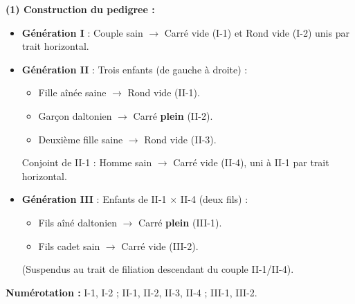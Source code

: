 \documentclass[11pt]{article}
\begin{document}
\begin{corrige}[Exercice 1]
\textbf{(1) Construction du pedigree :}
\begin{itemize}
\item \textbf{Génération I} : Couple sain $\rightarrow$ Carré vide (I-1) et Rond vide (I-2) unis par trait horizontal.
\item \textbf{Génération II} : Trois enfants (de gauche à droite) :
      \begin{itemize}
      \item Fille aînée saine $\rightarrow$ Rond vide (II-1).
      \item Garçon daltonien $\rightarrow$ Carré \textbf{plein} (II-2).
      \item Deuxième fille saine $\rightarrow$ Rond vide (II-3).
      \end{itemize}
      Conjoint de II-1 : Homme sain $\rightarrow$ Carré vide (II-4), uni à II-1 par trait horizontal.
\item \textbf{Génération III} : Enfants de II-1 $\times$ II-4 (deux fils) :
      \begin{itemize}
      \item Fils aîné daltonien $\rightarrow$ Carré \textbf{plein} (III-1).
      \item Fils cadet sain $\rightarrow$ Carré vide (III-2).
      \end{itemize}
      (Suspendus au trait de filiation descendant du couple II-1/II-4).
\end{itemize}
\textbf{Numérotation :} I-1, I-2 ; II-1, II-2, II-3, II-4 ; III-1, III-2.


\end{corrige}
\end{document}

